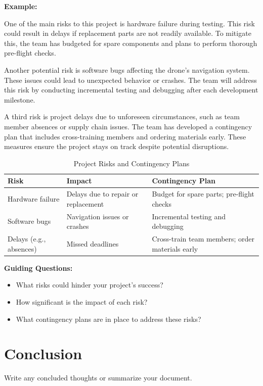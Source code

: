 \textbf{Example:}

One of the main risks to this project is hardware failure during testing. This risk could result in delays if replacement parts are not readily available. To mitigate this, the team has budgeted for spare components and plans to perform thorough pre-flight checks.

Another potential risk is software bugs affecting the drone's navigation system. These issues could lead to unexpected behavior or crashes. The team will address this risk by conducting incremental testing and debugging after each development milestone.

A third risk is project delays due to unforeseen circumstances, such as team member absences or supply chain issues. The team has developed a contingency plan that includes cross-training members and ordering materials early. These measures ensure the project stays on track despite potential disruptions.

\begin{table}[ht!]
    \centering
    \begin{tabular}{|l|l|l|}
        \hline
        \textbf{Risk} & \textbf{Impact} & \textbf{Contingency Plan} \\ \hline
        Hardware failure & Delays due to repair or replacement & Budget for spare parts; pre-flight checks \\ \hline
        Software bugs & Navigation issues or crashes & Incremental testing and debugging \\ \hline
        Delays (e.g., absences) & Missed deadlines & Cross-train team members; order materials early \\ \hline
    \end{tabular}
    \caption{Project Risks and Contingency Plans}
\end{table}

\textbf{Guiding Questions:}
\begin{itemize}
    \item What risks could hinder your project's success?
    \item How significant is the impact of each risk?
    \item What contingency plans are in place to address these risks?
\end{itemize}

\section{Conclusion}
Write any concluded thoughts or summarize your document.
\newpage

